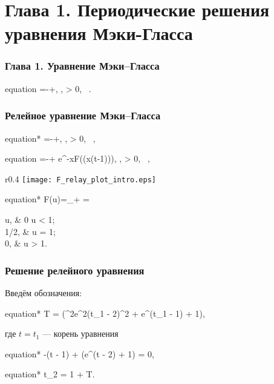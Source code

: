 \section{Глава 1. Периодические решения уравнения Мэки-Гласса}

\begin{frame}
	\frametitle{Глава 1. Уравнение Мэки--Гласса}
	\begin{empheq}[box=\myeq]{equation}
		\label{eq:mg}
		=-\beta+\alpha{},  \alpha, \beta > 0, \ \gamma {}. 
	\end{empheq}

\end{frame}

\begin{frame}
	\frametitle{Релейное уравнение Мэки--Гласса}
	\small
	\begin{empheq}[box=\diseq]{equation*}
		=-\beta+\alpha{},  \alpha, \beta > 0, \ \gamma {},
	\end{empheq}
	\begin{empheq}[box=\myeq]{equation}
		\label{eq:mg_relay}
		=-\beta + \alpha e^{-x}F(\exp(x(t-1))),  \alpha, \beta > 0, \ \gamma {}, 
	\end{empheq}
	\begin{wrapfigure}{r}{0.4\textwidth} 
		\centering
		\texttt{[image: F\_relay\_plot\_intro.eps]}
	\end{wrapfigure}
	\begin{empheq}[box=\myeq]{equation*}
		F(u)=\lim\limits_{\gamma\to +\infty} = 
		\begin{cases}
			u, & 0 \leqslant u < 1;\\
			1/2, & u = 1;\\
			0, & u > 1.
		\end{cases}
	\end{empheq}
	\normalsize
	
\end{frame}

\begin{frame}
	\frametitle{Решение релейного уравнения}
	Введём обозначения:
	\begin{empheq}[box=\myeq]{equation*}
		T =  \ln\left(\alpha^2e^{2\beta}(t_1 - 2)^2 + \alpha e^{\beta}(t_1 - 1) + 1\right),
	\end{empheq}
	где $t = t_1$ --- корень уравнения 
	\begin{empheq}[box=\myeq]{equation*}
		-\beta(t - 1) + \ln(\alpha e^{\beta}(t - 2) + 1) = 0,
	\end{empheq}
	\begin{empheq}[box=\myeq]{equation*}
		t_2 = 1 + T.
	\end{empheq}
\end{frame}

